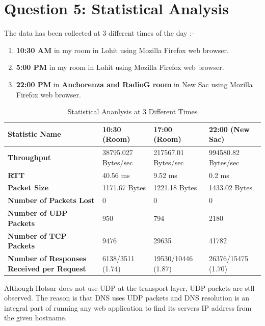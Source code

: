 \documentclass[a4paper,10pt]{article}
\begin{document}
\section*{Question 5: Statistical Analysis}
The data has been collected at 3 different times of the day :-
\begin{enumerate}
	\item \textbf{10:30 AM} in my room in Lohit using Mozilla Firefox web browser.
	\item \textbf{5:00 PM} in my room in Lohit using Mozilla Firefox web browser.
	\item \textbf{22:00 PM} in \textbf{Anchorenza and RadioG room} in New Sac using Mozilla Firefox web browser.
\end{enumerate}
\begin{table}[h]
	\begin{tabularx}{\textwidth}{|p{220pt}||X||X||X|}
		\hline
		\rowcolor{Magenta!40}
		\textbf{Statistic Name} & \textbf{10:30 (Room)} & \textbf{17:00 (Room)} & \textbf{22:00 (New Sac)} \\ \hline
		\textbf{Throughput}  & 38795.027 Bytes/sec & 217567.01 Bytes/sec & 994580.82 Bytes/sec \\ \hline
		\textbf{RTT}  & 40.56 ms & 9.52 ms & 0.2 ms \\ \hline
		\textbf{Packet Size} & 1171.67 Bytes & 1221.18 Bytes & 1433.02 Bytes \\ \hline
		\textbf{Number of Packets Lost}  & 0 & 0 & 0\\ \hline
		\textbf{Number of UDP Packets} & 950 & 794 & 2180 \\ \hline
		\textbf{Number of TCP Packets}& 9476 & 29635 & 41782\\ \hline
		\textbf{Number of Responses Received per Request}& 6138/3511 (1.74) & 19530/10446 (1.87) & 26376/15475 (1.70)\\ \hline
	\end{tabularx}
	\caption{Statistical Ananlysis at 3 Different Times}
\end{table}
Although Hotsar does not use UDP at the transport layer, UDP packets are stll observed. The reason is that DNS uses UDP packets and DNS resolution is an integral part of running any web application to find its servers IP address from the given hostname.
\end{document}
